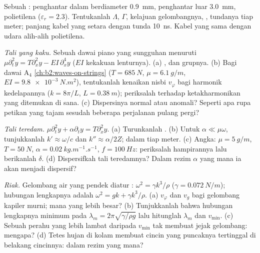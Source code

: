 \begin{exercise}[$\star$]\label{exo:b2:dispersion-wave-packets:4}
Sebuah : penghantar dalam berdiameter \qty{0.9}{mm}, penghantar luar
\qty{3.0}{mm}, polietilena ($\varepsilon_r = 2.3$). Tentukanlah $\Lambda$, $\Gamma$, kelajuan gelombangnya,
, tundanya tiap meter; panjang kabel yang setara
dengan tunda \qty{10}{ns}. Kabel yang sama dengan udara alih-alih polietilena.
\end{exercise}

\begin{exercise}[$\star\star$]\label{exo:b2:dispersion-wave-packets:5}
\emph{Tali yang kaku.} Sebuah dawai piano yang sungguhan menuruti $\mu\partial_t^2y = T\partial_x^2y
- EI\,\partial_x^4y$ ($EI$ kekakuan lenturnya). (a) ,
 dan grupnya. (b) Bagi dawai A$_4$
\cref{ch:b2:waves-on-strings} ($T = \qty{685}{N}$, $\mu = \qty{6.1}{g/m}$, $EI =
\qty{9.8e-3}{N.m^2}$), tentukanlah kenaikan nisbi $v_\varphi$ bagi harmonik
kedelapannya ($k = 8\pi/L$, $L = \qty{0.38}{m}$); periksalah terhadap ketakharmonikan
yang ditemukan di sana. (c) Dispersinya normal atau anomali? Seperti apa rupa
petikan yang tajam sesudah beberapa perjalanan pulang pergi?
\end{exercise}

\begin{exercise}[$\star\star$]\label{exo:b2:dispersion-wave-packets:6}
\emph{Tali teredam.} $\mu\partial_t^2y + \alpha\partial_ty = T\partial_x^2y$. (a) Turunkanlah
. (b) Untuk $\alpha \ll \mu\omega$, tunjukkanlah $k' \approx \omega/c$ dan
$k'' \approx \alpha/2Z$;  dalam  tiap meter. (c) Angka: $\mu =
\qty{5}{g/m}$, $T = \qty{50}{N}$, $\alpha = \qty{0.02}{kg.m^{-1}.s^{-1}}$, $f =
\qty{100}{Hz}$: periksalah hampirannya lalu berikanlah $\delta$. (d) Dispersifkah tali
teredamnya? Dalam rezim $\alpha$ yang mana ia akan menjadi dispersif?
\end{exercise}

\begin{exercise}[$\star\star$]\label{exo:b2:dispersion-wave-packets:7}
\emph{Riak.} Gelombang air yang pendek diatur : $\omega^2 =
\gamma k^3/\rho$ ($\gamma = \qty{0.072}{N/m}$); hubungan lengkapnya adalah $\omega^2 = gk +
\gamma k^3/\rho$. (a) $v_\varphi$ dan $v_g$ bagi gelombang kapiler murni; mana yang
lebih besar? (b) Tunjukkanlah bahwa  hubungan lengkapnya
minimum pada $\lambda_m = 2\pi\sqrt{\gamma/\rho g}$ lalu hitunglah $\lambda_m$ dan $v_{\min}$.
(c) Sebuah perahu yang lebih lambat daripada $v_{\min}$ tak membuat jejak gelombang: mengapa? (d) Tetes hujan di
kolam membuat cincin yang puncaknya tertinggal di belakang cincinnya: dalam rezim yang mana?
\end{exercise}

